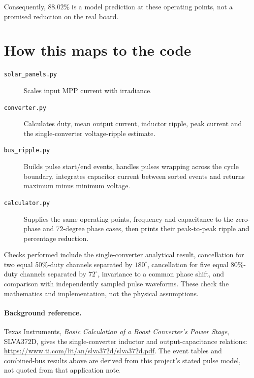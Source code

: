 \documentclass[11pt,a4paper]{article}
\begin{document}
Consequently, $88.02\%$ is a model prediction at these operating points, not a
promised reduction on the real board.

\section{How this maps to the code}

\begin{description}
 \item[\texttt{solar\_panels.py}] Scales input MPP current with irradiance.
 \item[\texttt{converter.py}] Calculates duty, mean output current, inductor
 ripple, peak current and the single-converter voltage-ripple estimate.
 \item[\texttt{bus\_ripple.py}] Builds pulse start/end events, handles pulses
 wrapping across the cycle boundary, integrates capacitor current between
 sorted events and returns maximum minus minimum voltage.
 \item[\texttt{calculator.py}] Supplies the same operating points, frequency
 and capacitance to the zero-phase and 72-degree phase cases, then prints
 their peak-to-peak ripple and percentage reduction.
\end{description}

Checks performed include the single-converter analytical result, cancellation
for two equal 50\%-duty channels separated by $180^\circ$, cancellation for
five equal 80\%-duty channels separated by $72^\circ$, invariance to a common
phase shift, and comparison with independently sampled pulse waveforms.
These check the mathematics and implementation, not the physical assumptions.

\paragraph{Background reference.}
Texas Instruments, \emph{Basic Calculation of a Boost Converter's Power Stage},
SLVA372D, gives the single-converter inductor and output-capacitance relations:
\url{https://www.ti.com/lit/an/slva372d/slva372d.pdf}.
The event tables and combined-bus results above are derived from this project's
stated pulse model, not quoted from that application note.
\end{document}
